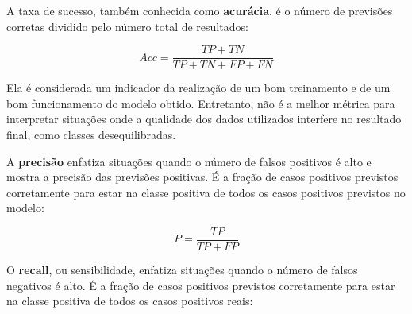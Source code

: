 \documentclass[portugues]{ic-tese}
\begin{document}
\begin{table}[h]
\label{tbl:ConfusionMatrix}
\begin{center}
  \caption{Matriz de confusão}
\end{center}
\end{table}

A taxa de sucesso, também conhecida como \textbf{acurácia}, é o número de previsões corretas dividido pelo número total de resultados:

\begin{equation}
Acc = \frac{TP + TN}{TP + TN + FP + FN}
\end{equation}

Ela é considerada um indicador da realização de um bom treinamento e de um bom funcionamento do modelo obtido. Entretanto, não é a melhor métrica para interpretar situações onde a qualidade dos dados utilizados interfere no resultado final, como classes desequilibradas.

A \textbf{precisão} enfatiza situações quando o número de falsos positivos é alto e mostra a precisão das previsões positivas. É a fração de casos positivos previstos corretamente para estar na classe positiva de todos os casos positivos previstos no modelo:

\begin{equation}
P = \frac{TP}{TP + FP}
\end{equation}

O \textbf{recall}, ou sensibilidade, enfatiza situações quando o número de falsos negativos é alto.  É a fração de casos positivos previstos corretamente para estar na classe positiva de todos os casos positivos reais:
\end{document}

